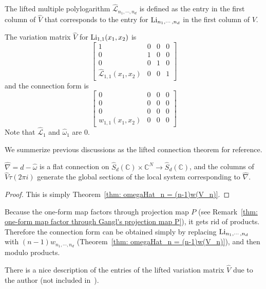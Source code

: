 \begin{definition}\label{def: LHat}
The lifted multiple polylogarithm $\widehat{\mathcal L}_{n_1,\cdots,n_d}$ is defined as the entry in the first column of $\widehat V$ that corresponds to the entry for $\operatorname{Li}_{n_1,\cdots,n_d}$ in the first column of $V$.
\end{definition}

\begin{example}
The variation matrix $\widehat V$ for $\operatorname{Li}_{1,1}(x_1,x_2)$ is
\[
\left[
\begin{array}{c|cc|c}
1&0&0&0\\
\hline
0&1&0&0\\
0&0&1&0\\
\hline
\widehat{\mathcal L}_{1,1}(x_1,x_2)&0&0&1
\end{array}
\right]
\]
and the connection form is
\[
\left[
\begin{array}{c|cc|c}
0&0&0&0\\
\hline
0&0&0&0\\
0&0&0&0\\
\hline
w_{1,1}(x_1,x_2)&0&0&0
\end{array}
\right]
\]
Note that $\widehat{\mathcal L}_1$ and $\widehat{\omega}_1$ are 0.
\end{example}

We summerize previous discussions as the lifted connection theorem for reference.

\begin{theorem}\label{thm: lifted connection}
$\widehat\nabla=d-\widehat\omega$ is a flat connection on $\widehat S_d(\mathbb C)\times\mathbb C^N\to \widehat S_d(\mathbb C)$, and the columns of $\widehat V\tau(2\pi i)$ generate the global sections of the local system corresponding to $\widehat\nabla$.
\end{theorem}

\begin{proof}
This is simply Theorem~\ref{thm: omegaHat_n = (n-1)w(V_n)}.
\end{proof}

Because the one-form map factors through projection map $P$ (see Remark~\ref{thm: one-form map factor through Gangl's projection map P}), it gets rid of products. Therefore the connection form can be obtained simply by replacing $\operatorname{Li}_{n_1,\cdots,n_d}$ with $(n-1)w_{n_1,\cdots,n_d}$ (Theorem~\ref{thm: omegaHat_n = (n-1)w(V_n)}), and then modulo products.

There is a nice description of the entries of the lifted variation matrix $\widehat V$ due to the author (not included in~\cite{ZDHZ_HopfAlgebrasOfMultiplePolylogarithmsAndHolomorphicOneForms}).

